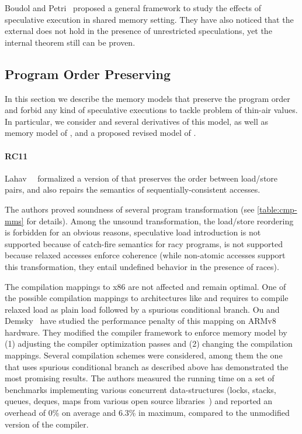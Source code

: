 Boudol and Petri~\cite{Boudol-Petri:ESOP10} proposed a general 
framework to study the effects of speculative execution in
shared memory setting. 
They have also noticed that the external \DRF does not 
hold in the presence of unrestricted speculations, 
yet the internal \DRF theorem still can be proven. 

\subsection{Program Order Preserving}
\label{sec:catalog:porf}

In this section we describe the memory models 
that preserve the program order and forbid any 
kind of speculative executions to tackle problem 
of thin-air values. 
In particular, we consider \RCMM and 
several derivatives of this model, 
as well as memory model of \OCaml, 
and a proposed revised model of \Java.  

\paragraph{RC11}

Lahav~\etal~\cite{Lahav-al:PLDI17} formalized 
a version of \CMM that preserves the order between load/store pairs, 
and also repairs the semantics of sequentially-consistent accesses.

The authors proved soundness of several program transformation 
(see \cref{table:cmp-mms} for details). 
Among the unsound transformation, 
the load/store reordering is forbidden for an obvious reasons, 
speculative load introduction is not supported 
because of catch-fire semantics for racy programs, 
\CSE is not supported because relaxed accesses 
enforce coherence (while non-atomic accesses 
support this transformation, they entail 
undefined behavior in the presence of races).

The compilation mappings to x86 are not affected and remain optimal.
One of the possible compilation mappings 
to architectures like \ARM and \POWER 
requires to compile relaxed load as  
plain load followed by a spurious conditional branch.
Ou and Demsky~\cite{Ou-Demsky:OOPSLA18} have studied 
the performance penalty of this mapping on ARMv8 hardware.
They modified the \LLVM compiler framework 
to enforce \RCMM memory model
by (1) adjusting the compiler optimization passes and 
(2) changing the compilation mappings.
Several compilation schemes were considered,
among them the one that uses spurious conditional branch
as described above has demonstrated the most promising results.  
The authors measured the running time on a set of benchmarks 
implementing various concurrent data-structures
(\eg locks, stacks, queues, deques, maps
from various open source libraries~\cite{CDSLib, FollyLib, JunctionLib})
and reported an overhead of 0\% on average and 6.3\% in maximum,
compared to the unmodified version of the compiler. 

